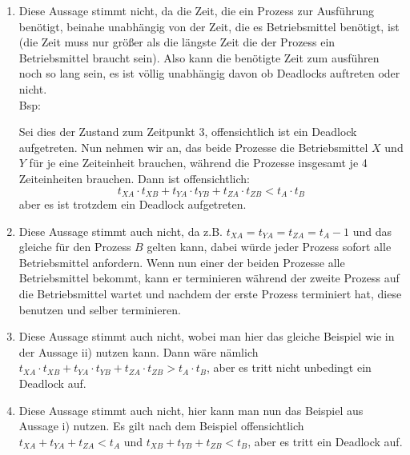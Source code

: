 \documentclass[a4paper,graphics,11pt]{article}
\begin{document}
\begin{enumerate}[label={\roman*)}]
    \item Diese Aussage stimmt nicht, da die Zeit, die ein Prozess zur Ausführung benötigt, beinahe unabhängig von der Zeit, die es Betriebsmittel benötigt, ist (die Zeit muss nur größer als die längste Zeit die der Prozess ein Betriebsmittel braucht sein). Also kann die benötigte Zeit zum ausführen noch so lang sein, es ist völlig unabhängig davon ob Deadlocks auftreten oder nicht.\\
    Bsp:\\
    Sei dies der Zustand zum Zeitpunkt 3, offensichtlich ist ein Deadlock aufgetreten. Nun nehmen wir an, das beide Prozesse die Betriebsmittel $X$ und $Y$ für je eine Zeiteinheit brauchen, während die Prozesse insgesamt je 4 Zeiteinheiten brauchen. Dann ist offensichtlich:
    $$
        t_{XA}\cdot t_{XB} + t_{YA}\cdot t_{YB} + t_{ZA} \cdot t_{ZB} < t_A \cdot t_B
    $$
    aber es ist trotzdem ein Deadlock aufgetreten.
    
    \item Diese Aussage stimmt auch nicht, da z.B. $t_{XA}=t_{YA}=t_{ZA}=t_A-1$ und das gleiche für den Prozess $B$ gelten kann, dabei würde jeder Prozess sofort alle Betriebsmittel anfordern. Wenn nun einer der beiden Prozesse alle Betriebsmittel bekommt, kann er terminieren während der zweite Prozess auf die Betriebsmittel wartet und nachdem der erste Prozess terminiert hat, diese benutzen und selber terminieren.

    \item Diese Aussage stimmt auch nicht, wobei man hier das gleiche Beispiel wie in der Aussage ii) nutzen kann. Dann wäre nämlich $t_{XA}\cdot t_{XB} + t_{YA}\cdot t_{YB} + t_{ZA} \cdot t_{ZB} > t_A \cdot t_B$, aber es tritt nicht unbedingt ein Deadlock auf.

    \item Diese Aussage stimmt auch nicht, hier kann man nun das Beispiel aus Aussage i) nutzen. Es gilt nach dem Beispiel offensichtlich $t_{XA}+t_{YA}+t_{ZA} < t_A$ und $t_{XB} + t_{YB} + t_{ZB} < t_B$, aber es tritt ein Deadlock auf. 
\end{enumerate}
\end{document}
